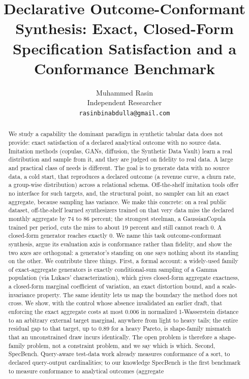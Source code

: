 \documentclass[11pt]{article}
\title{Declarative Outcome-Conformant Synthesis: Exact, Closed-Form Specification Satisfaction and a Conformance Benchmark}
\author{Muhammed Rasin\\ Independent Researcher\\ \texttt{rasinbinabdulla@gmail.com}}
\date{}
\begin{document}
\maketitle
\begin{abstract}
We study a capability the dominant paradigm in synthetic tabular data does not
provide: exact satisfaction of a declared analytical outcome with no source data. Imitation
methods (copulas, GANs, diffusion, the Synthetic Data Vault) learn a real distribution and
sample from it, and they are judged on fidelity to real data. A large and practical class of
needs is different. The goal is to generate data with no source data, a cold start, that
reproduces a declared outcome (a revenue curve, a churn rate, a group-wise distribution)
across a relational schema. Off-the-shelf imitation tools offer no interface for such targets,
and, the structural point, no sampler can hit an exact aggregate, because sampling has
variance. We make this concrete: on a real public dataset, off-the-shelf learned synthesizers
trained on that very data miss the declared monthly aggregate by 74 to 86 percent; the
strongest steelman, a GaussianCopula trained per period, cuts the miss to about 19 percent and
still cannot reach 0. A closed-form generator reaches exactly 0. We name this task
outcome-conformant synthesis, argue its evaluation axis is conformance rather than fidelity,
and show the two axes are orthogonal: a generator's standing on one says nothing about its
standing on the other. We contribute three things. First, a formal account: a widely-used
family of exact-aggregate generators is exactly conditional-sum sampling of a Gamma
population (via Lukacs' characterization), which gives closed-form aggregate exactness, a
closed-form marginal coefficient of variation, an exact distortion bound, and a
scale-invariance property. The same identity lets us map the boundary the method does not
cross. We show, with the control whose absence invalidated an earlier draft, that enforcing
the exact aggregate costs at most 0.006 in normalized 1-Wasserstein distance to an arbitrary
external target marginal, anywhere from light to heavy tails; the entire residual gap to that
target, up to 0.89 for a heavy Pareto, is shape-family mismatch that an unconstrained draw
incurs identically. The open problem is therefore a shape-family problem, not a constraint
problem, and we say which is which. Second, SpecBench. Query-aware test-data work already
measures conformance of a sort, to declared query-output cardinalities; to our knowledge
SpecBench is the first benchmark to measure conformance to analytical outcomes (aggregate

\end{abstract}
\end{document}
